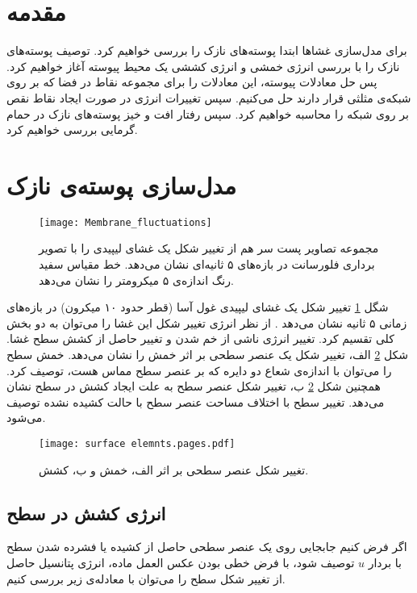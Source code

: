 \setRL
\clearpage
{} 


\section{
مقدمه
}
برای مدل‌سازی غشاها ابتدا پوسته‌های نازک را بررسی خواهیم کرد. توصیف پوسته‌های نازک را با بررسی انرژی خمشی و انرژی کششی یک محیط پیوسته آغاز خواهیم کرد. پس حل معادلات پیوسته، این معادلات را برای مجموعه نقاط در فضا که بر روی شبکه‌ی مثلثی قرار دارند حل می‌کنیم. سپس تغییرات انرژی در صورت ایجاد نقاط نقص بر روی شبکه را محاسبه خواهیم کرد. سپس رفتار افت و خیز پوسته‌های نازک در حمام گرمایی بررسی خواهیم کرد.

\section{
مدل‌سازی پوسته‌ی نازک
}

\begin{figure}[h]
\begin{center}
\texttt{[image: Membrane\_fluctuations]}
\caption{
مجموعه تصاویر پست سر هم از تغییر شکل یک غشای لیپیدی را با تصویر برداری فلورسانت در بازه‌های ۵ ثانیه‌ای نشان می‌دهد. خط مقیاس سفید رنگ اندازه‌ی ۵ میکرومتر را نشان می‌دهد. 
\cite{ParthasarathyMembraneMeasurement}
}
\label{fig:flucmem}
\end{center}
\end{figure}

شگل 
\ref{fig:flucmem}
تغییر شکل یک غشای لیپیدی غول آسا (قطر حدود ۱۰ میکرون) در بازه‌های زمانی ۵ ثانیه نشان می‌دهد
\cite{ParthasarathyMembraneMeasurement}
. از نظر انرژی تغییر شکل این غشا را می‌توان به دو بخش کلی تقسیم کرد. تغییر انرژی ناشی از خم شدن و تغییر حاصل از کشش سطح غشا. شکل
\ref{fig:elasticdeformation}
الف، تغییر شکل یک عنصر سطحی بر اثر خمش را نشان می‌دهد. خمش سطح را می‌توان با اندازه‌ی شعاع دو دایره که بر عنصر سطح مماس هست، توصیف کرد. همچنین شکل 
\ref{fig:elasticdeformation}
ب، تغییر شکل عنصر سطح به علت ایجاد کشش در سطح نشان می‌دهد. تغییر سطح با اختلاف مساحت عنصر سطح با حالت کشیده نشده توصیف می‌شود.
\begin{figure}[h]
\begin{center}
\texttt{[image: surface elemnts.pages.pdf]}
\caption{
تغییر شکل عنصر سطحی بر اثر الف، خمش و ب، کشش.
}
\label{fig:elasticdeformation}
\end{center}
\end{figure}

\subsection{
انرژی کشش در سطح
}
اگر فرض کنیم جابجایی روی یک عنصر سطحی حاصل از کشیده‌ یا فشرده شدن سطح با بردار 
$u$
توصیف شود، با فرض خطی بودن عکس العمل ماده، انرژی پتانسیل حاصل از تغییر شکل سطح را می‌توان با معادله‌ی زیر بررسی کنیم.

